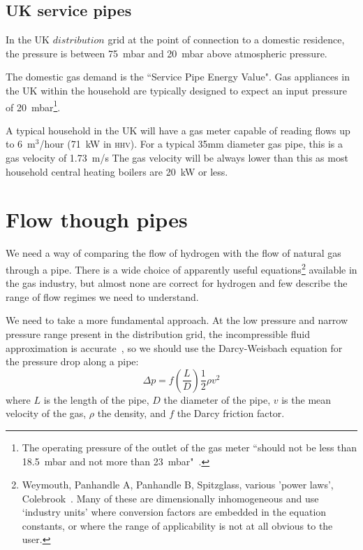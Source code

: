 \documentclass[5p]{elsarticle} %
\begin{document}
\subsection{UK service pipes}
In the UK $distribution$ grid at the point of connection to a domestic residence, the pressure is between 75~mbar and 20~mbar above atmospheric pressure. 
  
The domestic gas demand  is the ``Service Pipe Energy Value".
Gas appliances in the UK within the household are typically designed to expect an input pressure of 20~mbar\footnote{The operating pressure of the outlet of the gas meter ``should not be less than 18.5~mbar and not more than 23~mbar"~\citep{IGEM-G-13}.}. 

A typical household in the UK  will have a gas meter capable of reading flows up to 6~m$^3$/hour (71~kW in \textsc{hhv}). For a typical 35mm diameter gas pipe, this is a gas velocity of 1.73~m/s
The gas velocity will be always lower than this as most household central heating boilers are 20~kW or less. 

\section{Flow though pipes}
\label{sec:flow}

We need a way of comparing the flow of hydrogen with the flow of natural gas through a pipe. 
There is a wide choice of apparently useful equations\footnote{
Weymouth, Panhandle A, Panhandle B, Spitzglass, various 'power laws', Colebrook~\citep{Allen2007, She2012}. Many of these are dimensionally inhomogeneous and use `industry units' where conversion factors are embedded in the equation constants, or where the range of applicability is not at all obvious to the user.
}
available in the gas industry, but almost none are correct for hydrogen and few describe the range of flow regimes we need to understand.

We need to take a more fundamental approach.
At the low pressure and narrow pressure range present in the distribution grid, the incompressible fluid approximation is accurate~\citep{Perry2008}, so we should use the
Darcy-Weisbach equation for the pressure drop along a pipe:
\begin{equation}
\label{eqn:darcywiesbach}
\Delta p = f \left( \frac{L}{D} \right) \frac{1}{2} \rho v^2
\end{equation}
where $L$ is the length of the pipe,  $D$ the diameter of the pipe,  $v$ is the mean velocity of the gas, $\rho$ the density, and $f$ the Darcy friction factor.
\end{document}
